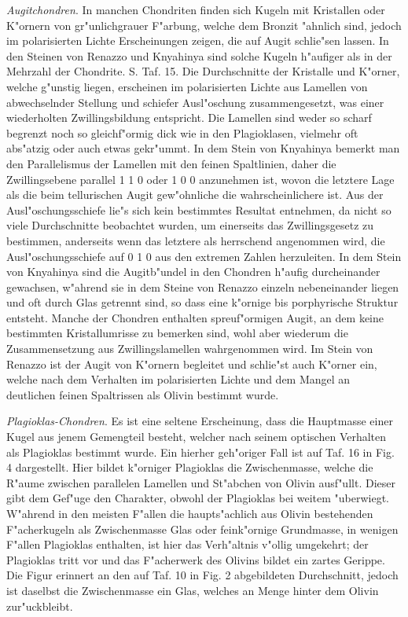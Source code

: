 \documentclass[a4paper, 11pt, oneside, polutonikogreek, german]{article}
\begin{document}
\emph{Augitchondren}. In manchen Chondriten finden sich Kugeln mit Kristallen oder K"ornern von gr"unlichgrauer F"arbung, welche dem Bronzit "ahnlich sind, jedoch im polarisierten Lichte Erscheinungen zeigen, die auf Augit schlie"sen lassen. In den Steinen von Renazzo und Knyahinya sind solche Kugeln h"aufiger als in der Mehrzahl der Chondrite. S. Taf. 15. Die Durchschnitte der Kristalle und K"orner, welche g"unstig liegen, erscheinen im polarisierten Lichte aus Lamellen von abwechselnder Stellung und schiefer Ausl"oschung zusammengesetzt, was einer wiederholten Zwillingsbildung entspricht. Die Lamellen sind weder so scharf begrenzt noch so gleichf"ormig dick wie in den Plagioklasen, vielmehr oft abs"atzig oder auch etwas gekr"ummt. In dem Stein von Knyahinya bemerkt man den Parallelismus der Lamellen mit den feinen Spaltlinien, daher die Zwillingsebene parallel 1 1 0 oder 1 0 0 anzunehmen ist, wovon die letztere Lage als die beim tellurischen Augit gew"ohnliche die wahrscheinlichere ist. Aus der Ausl"oschungsschiefe lie"s sich kein bestimmtes Resultat entnehmen, da nicht so viele Durchschnitte beobachtet wurden, um einerseits das Zwillingsgesetz zu bestimmen, anderseits wenn das letztere als herrschend angenommen wird, die Ausl"oschungsschiefe auf 0 1 0 aus den extremen Zahlen herzuleiten. In dem Stein von Knyahinya sind die Augitb"undel in den Chondren h"aufig durcheinander gewachsen, w"ahrend sie in dem Steine von Renazzo einzeln nebeneinander liegen und oft durch Glas getrennt sind, so dass eine k"ornige bis porphyrische Struktur entsteht. Manche der Chondren enthalten spreuf"ormigen Augit, an dem keine bestimmten Kristallumrisse zu bemerken sind, wohl aber wiederum die Zusammensetzung aus Zwillingslamellen wahrgenommen wird. Im Stein von Renazzo ist der Augit von K"ornern begleitet und schlie"st auch K"orner ein, welche nach dem Verhalten im polarisierten Lichte und dem Mangel an deutlichen feinen Spaltrissen als Olivin bestimmt wurde.

\emph{Plagioklas-Chondren}. Es ist eine seltene Erscheinung, dass die Hauptmasse einer Kugel aus jenem Gemengteil besteht, welcher nach seinem optischen Verhalten als Plagioklas bestimmt wurde. Ein hierher geh"origer Fall ist auf Taf. 16 in Fig. 4 dargestellt. Hier bildet k"orniger Plagioklas die Zwischenmasse, welche die R"aume zwischen parallelen Lamellen und St"abchen von Olivin ausf"ullt. Dieser gibt dem Gef"uge den Charakter, obwohl der Plagioklas bei weitem "uberwiegt. W"ahrend in den meisten F"allen die haupts"achlich aus Olivin bestehenden F"acherkugeln als Zwischenmasse Glas oder feink"ornige Grundmasse, in wenigen F"allen Plagioklas enthalten, ist hier das Verh"altnis v"ollig umgekehrt; der Plagioklas tritt vor und das F"acherwerk des Olivins bildet ein zartes Gerippe. Die Figur erinnert an den auf Taf. 10 in Fig. 2 abgebildeten Durchschnitt, jedoch ist daselbst die Zwischenmasse ein Glas, welches an Menge hinter dem Olivin zur"uckbleibt.
\end{document}

